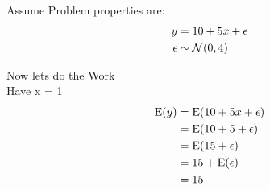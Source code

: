 Assume Problem properties are: 
\begin{align*}
y &= 10 + 5x + \epsilon \\
\epsilon &\sim \mathcal{N}(0,4)
\end{align*}

Now lets do the Work \\
Have x = 1 \\
\begin{align*}
\mathrm{E}(y) &= \mathrm{E}(10 + 5x + \epsilon) \\
&= \mathrm{E}(10 + 5 + \epsilon) \\
&= \mathrm{E}(15 + \epsilon) \\
&= 15 + \mathrm{E}(\epsilon) \\
&= 15
\end{align*}